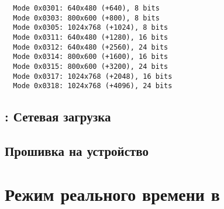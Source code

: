 \begin{verbatim}
  Mode 0x0301: 640x480 (+640), 8 bits
  Mode 0x0303: 800x600 (+800), 8 bits
  Mode 0x0305: 1024x768 (+1024), 8 bits
  Mode 0x0311: 640x480 (+1280), 16 bits
  Mode 0x0312: 640x480 (+2560), 24 bits
  Mode 0x0314: 800x600 (+1600), 16 bits
  Mode 0x0315: 800x600 (+3200), 24 bits
  Mode 0x0317: 1024x768 (+2048), 16 bits
  Mode 0x0318: 1024x768 (+4096), 24 bits
\end{verbatim}

\section{: Сетевая загрузка} \label{aznetboot}

\section{Прошивка на устройство} \label{azfirmware}

\chapter{Режим реального времени в \linux} \label{linrt}
